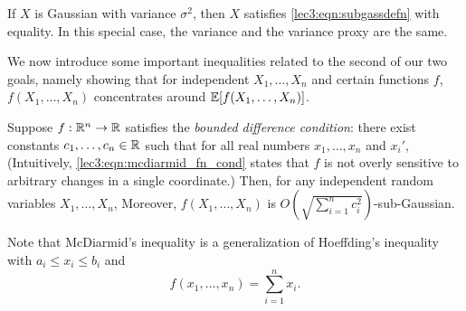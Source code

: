 \begin{example}
If $X$ is Gaussian with variance $\sigma^2$, then $X$ satisfies \eqref{lec3:eqn:subgassdefn} with equality. In this special case, the variance and the variance proxy are the same.
\end{example}

We now introduce some important inequalities related to the second of our two goals, namely showing that for independent $X_1, \dotsc, X_n$ and certain functions $f$, $f(X_1, \dotsc, X_n)$ concentrates around $\operatorname*{\mathbb{E}}[f(X_1, \dotsc, X_n)]$.

\begin{theorem}
    Suppose $f : \mathbb R^n \to \mathbb R$ satisfies the \emph{bounded difference condition}: there exist constants $c_1, \ldots, c_n \in \mathbb R$ such that for all real numbers $x_1, \ldots, x_n$ and $x_i'$,
    (Intuitively, \eqref{lec3:eqn:mcdiarmid_fn_cond} states that $f$ is not overly sensitive to arbitrary changes in a single coordinate.) Then, for any independent random variables $X_1, \ldots, X_n$,
    Moreover, $f(X_1, \ldots, X_n)$ is $O\left(\sqrt{\sum_{i = 1}^n c_i^2}\right)$-sub-Gaussian.
\end{theorem}

\begin{remark}
    Note that McDiarmid's inequality is a generalization of Hoeffding's inequality with $a_i \leq x_i \leq b_i$ and
    \begin{equation}
        f(x_1, \dotsc, x_n) = \sum_{i = 1}^n x_i.
    \end{equation} 
\end{remark}

